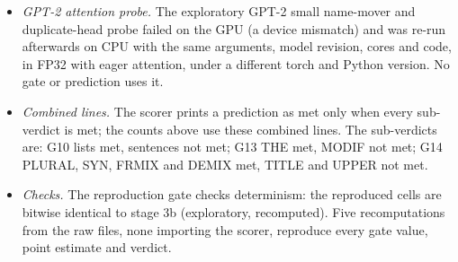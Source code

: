\begin{itemize}
  \item \emph{GPT-2 attention probe.} The exploratory GPT-2 small name-mover and duplicate-head probe failed on the GPU (a device mismatch) and was re-run afterwards on CPU with the same arguments, model revision, cores and code, in FP32 with eager attention, under a different torch and Python version. No gate or prediction uses it.
  \item \emph{Combined lines.} The scorer prints a prediction as met only when every sub-verdict is met; the counts above use these combined lines. The sub-verdicts are: G10 lists met, sentences not met; G13 THE met, MODIF not met; G14 PLURAL, SYN, FRMIX and DEMIX met, TITLE and UPPER not met.
  \item \emph{Checks.} The reproduction gate checks determinism: the reproduced cells are bitwise identical to stage 3b (exploratory, recomputed). Five recomputations from the raw files, none importing the scorer, reproduce every gate value, point estimate and verdict.
\end{itemize}

